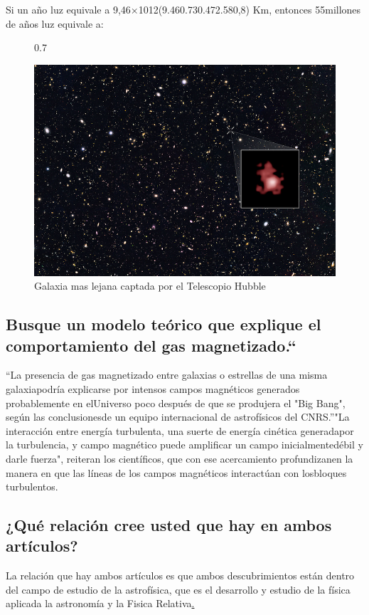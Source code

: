 \documentclass[11pt]{article}
\begin{document}
\begin{multicols}{2}
  Si un año luz equivale a 9,46×1012(9.460.730.472.580,8) Km, entonces 55millones de años luz equivale a:  \cite{luz}

\begin{figure}{0.7\linewidth}
  
  \centering
  \includegraphics[width=0.6\linewidth]{year.png}
  \caption{Galaxia mas lejana captada por el Telescopio Hubble}
  
\end{figure}

\subsection{Busque un modelo teórico que explique el comportamiento del gas magnetizado.“}

  “La presencia de gas magnetizado entre galaxias o estrellas de una misma galaxiapodría explicarse por intensos campos magnéticos generados probablemente en elUniverso poco después de que se produjera el "Big Bang", según las conclusionesde un equipo internacional de astrofísicos del CNRS.”"La interacción entre energía turbulenta, una suerte de energía cinética generadapor la turbulencia, y campo magnético puede amplificar un campo inicialmentedébil y darle fuerza", reiteran los científicos, que con ese acercamiento profundizanen la manera en que las líneas de los campos magnéticos interactúan con losbloques turbulentos.\cite{gases}

\subsection{¿Qué relación cree usted que hay en ambos artículos?}
  
  La relación que hay ambos artículos es que ambos descubrimientos están dentro del campo de estudio de la astrofísica\href{sec:1} , que es el desarrollo y estudio de la física aplicada la astronomía y la Fisica Relativa\href{sec:1}.
  

\end{multicols}
\end{document}

